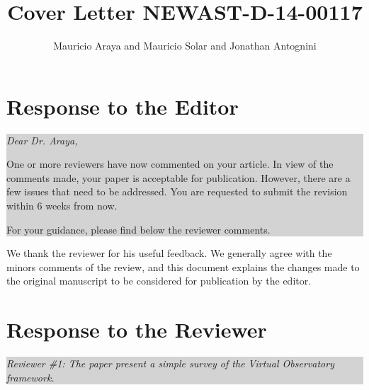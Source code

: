 \documentclass[a4paper]{article}
\title{Cover Letter NEWAST-D-14-00117}
\author{Mauricio Araya and Mauricio Solar and Jonathan Antognini}
\newcommand{\quoting}[1]{
  
  
  \colorbox{lightgray}{
    \begin{minipage}{0.98\linewidth}
      \em #1
    \end{minipage}
  }
  
  
}
\begin{document}
\maketitle



\section{Response to the Editor}

\quoting{
Dear Dr. Araya,

One or more reviewers have now commented on your article. In view of the
comments made, your paper is acceptable for publication. However, there are a
few issues that need to be addressed.
You are requested to submit the revision within 6 weeks from now.

For your guidance, please find below the reviewer comments.
}
\vspace{0.5cm}

We thank the reviewer for his useful feedback. We generally agree
with the minors comments of the review, and this document 
explains the changes made to the original manuscript to be 
considered for publication by the editor.
\vspace{0.5cm}


\section{Response to the Reviewer}

\quoting{
Reviewer \#1: The paper present a simple survey of the Virtual Observatory
framework. 
}
\vspace{0.5cm}
\end{document}

